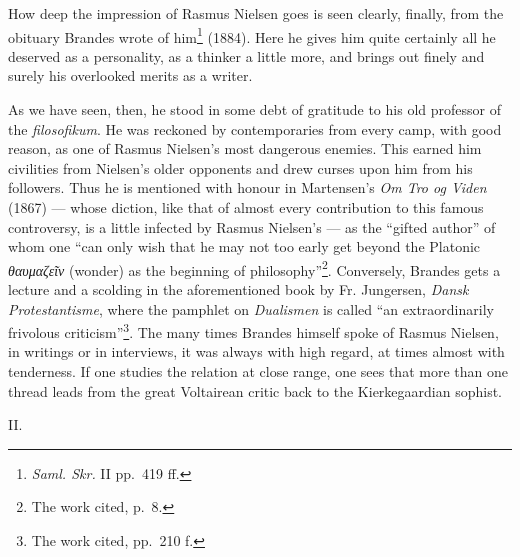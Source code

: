 \documentclass[12pt,a4paper,openany]{book}
\newcommand{\opage}[1]{\marginnote{\footnotesize\textit{[#1]}}}
\begin{document}
How deep the impression of Rasmus Nielsen goes is seen clearly, finally, from the obituary Brandes wrote of
him\footnote{\textit{Saml. Skr.} II pp.~419 ff.} (1884). Here he gives him quite certainly all he deserved as a
personality, as a thinker a little more, and brings out finely and surely his overlooked merits as a writer.

As we have seen, then, he stood in some debt of gratitude to his old professor of the \textit{filosofikum}. He was
reckoned by contemporaries from
\opage{152}\setcounter{footnote}{0}%
every camp, with good reason, as one of Rasmus Nielsen's most dangerous enemies. This earned him civilities from
Nielsen's older opponents and drew curses upon him from his followers. Thus he is mentioned with honour in
Martensen's \textit{Om Tro og Viden} (1867) --- whose diction, like that of almost every contribution to this
famous controversy, is a little infected by Rasmus Nielsen's --- as the ``gifted author'' of whom one ``can only
wish that he may not too early get beyond the Platonic \textit{θαυμαζεῖν} (wonder) as the beginning of
philosophy''\footnote{The work cited, p.~8.}. Conversely, Brandes gets a lecture and a scolding in the
aforementioned book by Fr. Jungersen, \textit{Dansk Protestantisme}, where the pamphlet on \textit{Dualismen} is
called ``an extraordinarily frivolous criticism''\footnote{The work cited, pp.~210 f.}. The many times Brandes
himself spoke of Rasmus Nielsen, in writings or in interviews, it was always with high regard, at times almost with
tenderness. If one studies the relation at close range, one sees that more than one thread leads from the great
Voltairean critic back to the Kierkegaardian sophist.

\begin{center}II.\end{center}
\end{document}
